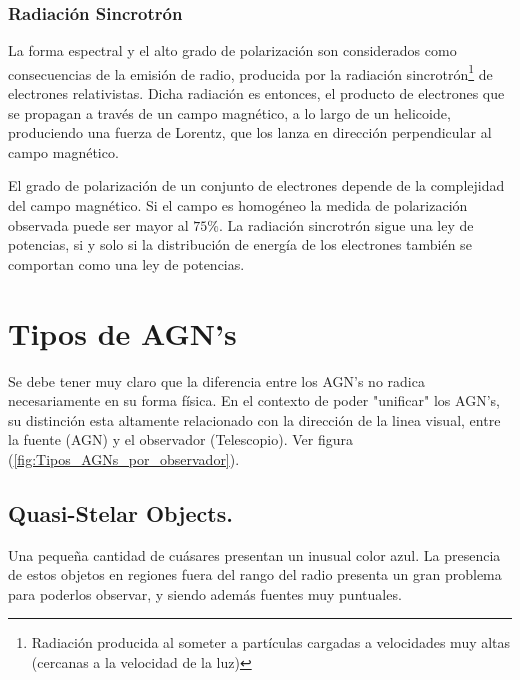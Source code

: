 	\subsubsection{Radiación Sincrotrón}
	\label{subsubsec: Radiation_synchrotron}

La forma espectral y el alto grado de polarización son considerados como consecuencias de la emisión de radio, producida por la radiación sincrotrón\footnote{Radiación producida al someter a partículas cargadas a velocidades muy altas (cercanas a la velocidad de la luz) } de electrones relativistas. Dicha radiación es entonces, el producto de electrones que se propagan a través de un campo magnético, a lo largo de un helicoide, produciendo una fuerza de Lorentz, que los lanza en dirección perpendicular al campo magnético. 

El grado de polarización de un conjunto de electrones depende de la complejidad del campo magnético. Si el campo es homogéneo la medida de polarización observada puede ser mayor al $75\%$. La radiación sincrotrón sigue una ley de potencias, si y solo si  la distribución de energía de los electrones también se comportan como una ley de potencias. 


\section{Tipos de AGN's}
\label{sec:Zoo_AGN's}

Se debe tener muy claro que la diferencia entre los AGN's no radica necesariamente en su forma física. En el contexto de poder "unificar"  los AGN's, su distinción esta altamente relacionado con la dirección de la linea visual, entre la fuente (AGN) y el observador (Telescopio). Ver figura (\ref{fig:Tipos_AGNs_por_observador}).


	\subsection{Quasi-Stelar Objects.}
	\label{subsec:Quasi-Stelar_Objects}

Una pequeña cantidad de cuásares presentan un inusual color azul. La presencia de estos objetos en regiones fuera del rango del radio presenta un gran problema para poderlos observar, y siendo además fuentes muy puntuales.

